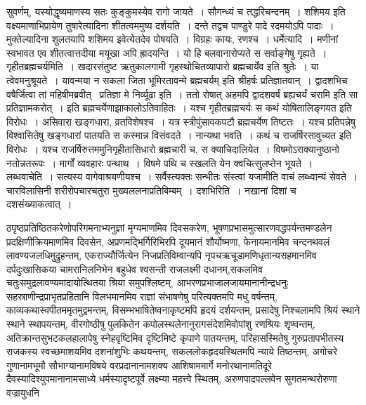 \documentclass[11pt, openany]{book}
\begin{document}
\noindent
{\s सुवर्णम्, यस्योद्धृष्यमाणस्य सतः कुङ्कुमस्येव रागो जायते~। सौगन्ध्यं च तद्धरिचन्दनम्~। शशिमय इति वक्ष्यमाणाभिप्रायेण तुषारेत्यादिना शीतत्वममुष्य दर्शयति~। दन्ते तद्वच पाण्डुरे पादे रदमयोऽपि पादाः~। मुक्तेल्यादिना शुलतयापि शशिमय इवेत्येतदेव पोषयति~। विग्रहः कायः, रणश्च~। {\qtt धर्मेत्यादि}~। मणीनां स्वभावत एव शीतत्वात्तदीया मयूखा अपि ह्रादयन्ति~। यो हि बलवानारोप्यते स सर्वाङ्गेषु गृह्यते~। {\qtt गृहीतब्रह्मचर्यमिति}~। खदारसंतुष्ट ऋतुकालगामी {\qt गृहस्थोचितव्यापारो ब्रह्मचार्येव} इति श्रुतेः~। या त्वेवमनुश्रूयते~। {\qt यावन्मया न सकला जिता भूमिरतावन्मे ब्रह्मचर्यम्} इति श्रीहर्षः प्रतिज्ञातवान्~। द्वादशभिच वषैर्जित्वा तां महिषीमब्रवीत् \textendash\ {\qt प्रतिज्ञा मे निर्व्यूढा} इति~। ततो रोषात् {\qt अहमपि द्वादशवर्षं ब्रह्यचर्यं चरामि} इति सा प्रतिज्ञामकरोत्~। इति ब्रह्मचर्येणाझाकालोऽतिवाहितः~। यश्च गृहीतब्रह्मचर्यः स कथं योषितालिङ्गयत इति विरोधः~। असिवारा खङ्गधारा, व्रतविशेषश्च~। यत्र स्त्रीपुंसावकपटौ ब्रह्मचर्येण तिष्टतः~। यश्च प्रतिपन्नेषु विश्वासितेषु खङ्गधारां पातयति स कस्मान्न विसंवदते~। नान्यथा भवति~। कथं च राजर्षिरसावुच्यत इति विरोधः~। यश्च राजर्षिरुत्तममुनिगृहीतासिधारो ब्रह्मचारी च, स क्याचिदालियेत~। विषमोऽराक्यानुष्ठानो नतोन्नतरूपः~। मार्गों व्यवहारः पन्थाथ~। विषमे पथि च स्खलति येन क्वचित्सुलप्तेन भूयते~। {\qtt लब्धवाचेति}~। सत्यस्य वागेवाश्रयणीयश्च~। सर्वैस्त्यक्तः सन्भीतः संस्त्वां यजामीति वाचं लब्ध्वान्यं सेवते~। चारविलासिनी शरीरोपचारचतुरा मुख्यललनाप्रतिबिम्बम्~। {\qtt दशभिरिति}~। नखानां दिशां च दशसंख्याकत्वात्~।}

\newpage

\noindent
ठपृष्ठप्रतिष्ठितकरेणोपरिगमनाभ्यनुज्ञां मृग्यमाणमिव दिवसकरेण, भूषणप्रभासमुत्सारणवद्धपर्यन्तमण्डलेन प्रदक्षिणीक्रियमाणमिव दिवसेन, अप्रणमद्भिर्गिरिभिरपि दूयमानं शौर्योष्मणा, फेनायमानमिव चन्दनथवलं लावण्यजलधिमुद्रुहन्तम्, एकराज्यौर्जित्येन निजप्रतिविम्वान्यपि नृपचऋचूडामणिधृतान्यसहमानमिव दर्पदुःखासिकया चामरानिलनिभेन बहुधेव श्वसन्ती राजलक्ष्मी दधानम्,सकलमिव चतुःसमुद्रलावण्यमादायोत्थितया श्रिया समुपश्लिष्टम्, आभरणप्रभाजालजायमानानीन्द्रधनुः सहस्राणीन्द्रप्राभृतप्रहितानि विलभमानमिव राज्ञां संभाषणेषु परित्यक्तमपि मधु वर्षन्तम्, काव्यकथास्वपीतममृतमुद्वमन्तम्, विसम्भभाषितेष्वनाकृष्टमपि हृदयं दर्शयन्तम्, प्रसादेषु निश्चलामपि श्रियं स्थाने स्थाने स्थापयन्तम्, वीरगोष्ठीषु पुलकितेन कपोलस्थलेनानुरागसंदेशमिवोपांशु रणश्रियः शृण्वन्तम्, अतिक्रान्तसुभटकलहालापेषु स्नेहवृष्टिमिव दृष्टिमिष्टे कृपाणे पातयन्तम्, परिहासस्मितेषु गुरुप्रतापभीतस्य राजकस्य स्वच्छमाशयमिव दशनांशुभिः कथयन्तम्, सकललोकहृदयस्थितमपि न्याये तिष्ठन्तम्, अगोचरे गुणानामभूमौ सौभाग्यानामविषये वरप्रदानानामशक्य आशिषाममार्गे मनोरथानामतिदूरे दैवस्यादिश्युपमानानामसाध्ये धर्मस्यादृष्टपूर्वे लक्ष्म्या महत्त्वे स्थितम्, अरुणपादपल्लवेन सुगतमन्थरोरुणा वज्रायुधनि\textendash
\end{document}

